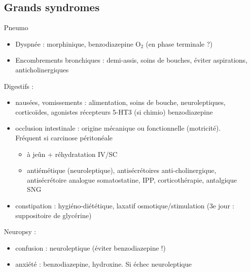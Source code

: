 \documentclass[11pt]{article}
\begin{document}
\printglossaries

\subsection{Grands syndromes}
\label{sec:orgf34cd9c}
Pneumo 
\begin{itemize}
\item Dyspnée : morphinique, benzodiazepine \textpm{} O\(_{\text{2}}\) (en phase terminale ?)
\item Encombrements bronchiques : demi-assis, soins de bouches, éviter aspirations,
anticholinergiques
\end{itemize}

Digestifs :
\begin{itemize}
\item nausées, vomissements : alimentation, soins de bouche, neuroleptiques,
corticoïdes, agonistes récepteurs 5-HT3 (si chimio) \textpm{} benzodiazepine
\item occlusion intestinale : origine mécanique ou fonctionnelle
(motricité). Fréquent si carcinose péritonéale
\begin{itemize}
\item à jeûn + réhydratation IV/SC
\item antiémétique (neuroleptique), antisécrétoires anti-cholinergique,
antisécrétoire analogue somatostatine, IPP, corticothérapie, antalgique \textpm{}
SNG
\end{itemize}
\item constipation : hygiéno-diététique, laxatif osmotique/stimulation (3e jour :
suppositoire de glycérine)
\end{itemize}

Neuropsy :
\begin{itemize}
\item confusion : neuroleptique (éviter benzodiazepine !)
\item anxiété : benzodiazepine, hydroxine. Si échec neuroleptique
\end{itemize}
\end{document}
